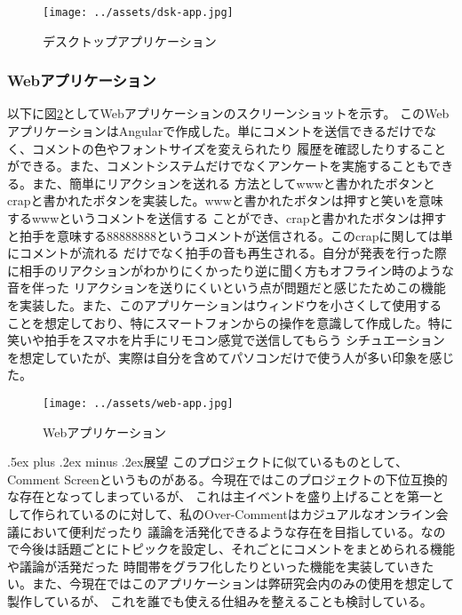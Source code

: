 \documentclass[a4j,twocolumn]{ujarticle}
\makeatletter
\def\subsection{\@startsection{subsection}{1}{\z@}{.7ex plus .2ex minus .2ex}%
{.5ex plus .2ex minus .2ex}{\normalsize\bfseries}}
\makeatother
\begin{document}
\begin{figure}[h]
\centering
\texttt{[image: ../assets/dsk-app.jpg]}
\caption{デスクトップアプリケーション}
\label{dsk-app}
\end{figure}

\subsubsection{Webアプリケーション}
以下に図\ref{web-app}としてWebアプリケーションのスクリーンショットを示す。
このWebアプリケーションはAngularで作成した。単にコメントを送信できるだけでなく、コメントの色やフォントサイズを変えられたり
履歴を確認したりすることができる。また、コメントシステムだけでなくアンケートを実施することもできる。また、簡単にリアクションを送れる
方法としてwwwと書かれたボタンとcrapと書かれたボタンを実装した。wwwと書かれたボタンは押すと笑いを意味するwwwというコメントを送信する
ことができ、crapと書かれたボタンは押すと拍手を意味する88888888というコメントが送信される。このcrapに関しては単にコメントが流れる
だけでなく拍手の音も再生される。自分が発表を行った際に相手のリアクションがわかりにくかったり逆に聞く方もオフライン時のような音を伴った
リアクションを送りにくいという点が問題だと感じたためこの機能を実装した。また、このアプリケーションはウィンドウを小さくして使用する
ことを想定しており、特にスマートフォンからの操作を意識して作成した。特に笑いや拍手をスマホを片手にリモコン感覚で送信してもらう
シチュエーションを想定していたが、実際は自分を含めてパソコンだけで使う人が多い印象を感じた。

\begin{figure}[h]
\centering
\texttt{[image: ../assets/web-app.jpg]}
\caption{Webアプリケーション}
\label{web-app}
\end{figure}

\subsection{展望}
このプロジェクトに似ているものとして、Comment Screenというものがある。今現在ではこのプロジェクトの下位互換的な存在となってしまっているが、
これは主イベントを盛り上げることを第一として作られているのに対して、私のOver-Commentはカジュアルなオンライン会議において便利だったり
議論を活発化できるような存在を目指している。なので今後は話題ごとにトピックを設定し、それごとにコメントをまとめられる機能や議論が活発だった
時間帯をグラフ化したりといった機能を実装していきたい。また、今現在ではこのアプリケーションは弊研究会内のみの使用を想定して製作しているが、
これを誰でも使える仕組みを整えることも検討している。
\end{document}
